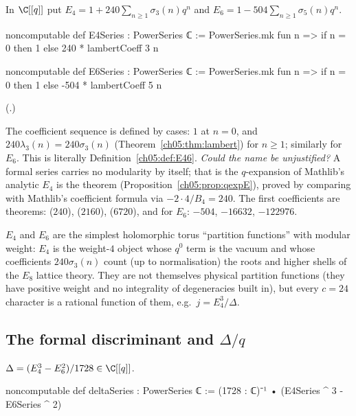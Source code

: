 \begin{definition}[Formal $E_4$, $E_6$]\label{ch05:def:E46}
In $\C[[q]]$ put $E_4 = 1 + 240\sum_{n\ge1}\sigma_3(n)q^n$ and $E_6 = 1 - 504\sum_{n\ge1}\sigma_5(n)q^n$.
\end{definition}
\begin{leancode}
noncomputable def E4Series : PowerSeries ℂ :=
  PowerSeries.mk fun n => if n = 0 then 1 else 240 * lambertCoeff 3 n

noncomputable def E6Series : PowerSeries ℂ :=
  PowerSeries.mk fun n => if n = 0 then 1 else -504 * lambertCoeff 5 n
\end{leancode}
(.)
\begin{dictionary}
The coefficient sequence is defined by cases: $1$ at $n = 0$, and $240\lambda_3(n) = 240\sigma_3(n)$
(Theorem~\ref{ch05:thm:lambert}) for $n\ge1$; similarly for $E_6$. This is literally
Definition~\ref{ch05:def:E46}. \emph{Could the name be unjustified?} A formal series carries no
modularity by itself; that  is the $q$-expansion of Mathlib's analytic $E_4$ is the
theorem  (Proposition~\ref{ch05:prop:qexpE}), proved by comparing with Mathlib's
coefficient formula via $-2\cdot4/B_4 = 240$. The first coefficients are theorems:
 ($240$),  ($2160$), 
($6720$), and for $E_6$: $-504$, $-16632$, $-122976$.
\end{dictionary}

\begin{physics}
$E_4$ and $E_6$ are the simplest holomorphic torus ``partition functions'' with modular weight: $E_4$ is the weight-$4$ object whose $q^0$ term is the vacuum and whose coefficients $240\sigma_3(n)$ count (up to normalisation) the roots and higher shells of the $E_8$ lattice theory. They are not themselves physical partition functions (they have positive weight and no integrality of degeneracies built in), but every $c=24$ character is a rational function of them, e.g.\ $j=E_4^3/\Delta$.
\end{physics}

\subsection{The formal discriminant and \texorpdfstring{$\Delta/q$}{Delta/q}}

\begin{definition}\label{ch05:def:delta}
$\Delta = (E_4^3 - E_6^2)/1728\in\C[[q]]$.
\end{definition}
\begin{leancode}
noncomputable def deltaSeries : PowerSeries ℂ :=
  (1728 : ℂ)⁻¹ • (E4Series ^ 3 - E6Series ^ 2)
\end{leancode}

